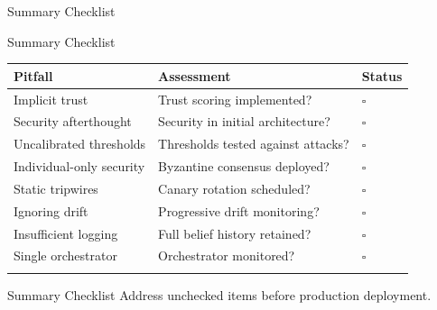 \documentclass[
  ignorenonframetext,
]{beamer}
\newcounter{none} %
\begin{document}
\begin{frame}[allowframebreaks]{Summary Checklist}
\protect{}\label{summary-checklist}
\end{frame}

\begin{frame}[allowframebreaks]{Summary Checklist}
{\def\LTcaptype{none} %
\begin{longtable}[]{@{}
  >{\raggedright\arraybackslash}p{}
  >{\raggedright\arraybackslash}p{}
  >{\raggedright\arraybackslash}p{}@{}}
\toprule\noalign{}
\begin{minipage}[b]{\linewidth}\raggedright
Pitfall
\end{minipage} & \begin{minipage}[b]{\linewidth}\raggedright
Assessment
\end{minipage} & \begin{minipage}[b]{\linewidth}\raggedright
Status
\end{minipage} \\
\midrule\noalign{}
\endhead
Implicit trust & Trust scoring implemented? & \(\square\) \\
Security afterthought & Security in initial architecture? &
\(\square\) \\
Uncalibrated thresholds & Thresholds tested against attacks? &
\(\square\) \\
Individual-only security & Byzantine consensus deployed? &
\(\square\) \\
Static tripwires & Canary rotation scheduled? & \(\square\) \\
Ignoring drift & Progressive drift monitoring? & \(\square\) \\
Insufficient logging & Full belief history retained? & \(\square\) \\
Single orchestrator & Orchestrator monitored? & \(\square\) \\
\bottomrule\noalign{}
\end{longtable}
}

\end{frame}

\begin{frame}[allowframebreaks]{Summary Checklist}
Address unchecked items before production deployment.
\end{frame}
\end{document}
